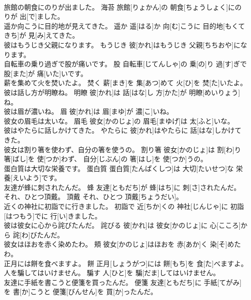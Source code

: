 \documentclass[8pt]{extreport}
\begin{document}
\begin{CJK}{UTF8}{min}
\\	旅館の朝食にのりが出ました。	海苔	旅館[りょかん]の 朝食[ちょうしょく]にのりが 出[で]ました。	
\\	遥か向こうに目的地が見えてきた。	遥か	遥[はる]か 向[む]こうに 目的地[もくてきち]が 見[み]えてきた。	
\\	彼はもうじき父親になります。	もうじき	彼[かれ]はもうじき 父親[ちちおや]になります。	
\\	自転車の乗り過ぎで股が痛いです。	股	自転車[じてんしゃ]の 乗[の]り 過[す]ぎで 股[また]が 痛[いた]いです。	
\\	薪を集めて火を焚いたよ。	焚く	薪[まき]を 集[あつ]めて 火[ひ]を 焚[た]いたよ。	
\\	彼は話し方が明瞭ね。	明瞭	彼[かれ]は 話[はな]し 方[かた]が 明瞭[めいりょう]ね。	
\\	彼は眉が濃いね。	眉	彼[かれ]は 眉[まゆ]が 濃[こ]いね。	
\\	彼女の眉毛は太いな。	眉毛	彼女[かのじょ]の 眉毛[まゆげ]は 太[ふと]いな。	
\\	彼はやたらに話しかけてきた。	やたらに	彼[かれ]はやたらに 話[はな]しかけてきた。	
\\	彼女は割り箸を使わず、自分の箸を使うの。	割り箸	彼女[かのじょ]は 割[わ]り 箸[ばし]を 使[つか]わず、 自分[じぶん]の 箸[はし]を 使[つか]うの。	
\\	蛋白質は大切な栄養です。	蛋白質	蛋白質[たんぱくしつ]は 大切[たいせつ]な 栄養[えいよう]です。	
\\	友達が蜂に刺されたんだ。	蜂	友達[ともだち]が 蜂[はち]に 刺[さ]されたんだ。	
\\	それ、ひとつ頂戴。	頂戴	それ、ひとつ 頂戴[ちょうだい]。	
\\	近くの神社に初詣でに行きました。	初詣で	近[ちか]くの 神社[じんじゃ]に 初詣[はつもう]でに 行[い]きました。	
\\	彼は彼女に心から詫びたんだ。	詫びる	彼[かれ]は 彼女[かのじょ]に 心[こころ]から 詫[わ]びたんだ。	
\\	彼女はほおを赤く染めたわ。	頬	彼女[かのじょ]はほおを 赤[あか]く 染[そ]めたわ。	
\\	正月には餅を食べますよ。	餅	正月[しょうがつ]には 餅[もち]を 食[た]べますよ。	
\\	人を騙してはいけません。	騙す	人[ひと]を 騙[だま]してはいけません。	
\\	友達に手紙を書こうと便箋を買ったんだ。	便箋	友達[ともだち]に 手紙[てがみ]を 書[か]こうと 便箋[びんせん]を 買[か]ったんだ。	
\end{CJK}
\end{document}
